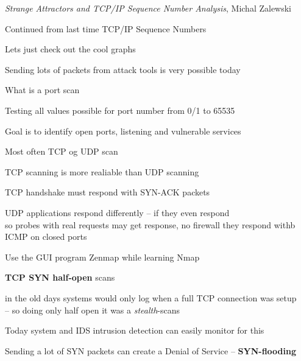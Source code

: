\documentclass[Screen16to9,17pt]{foils}
\begin{document}

\emph{Strange Attractors and TCP/IP Sequence Number Analysis}, Michal Zalewski\\ 

\begin{list1}
\item Continued from last time TCP/IP Sequence Numbers
\begin{list2}
\item Lets just check out the cool graphs
\item Sending lots of packets from attack tools is very possible today
\end{list2}
\end{list1}



\begin{list1}
\item What is a port scan
\item Testing all values possible for port number from 0/1 to 65535
\item Goal is to identify open ports, listening and vulnerable services
\item Most often TCP og UDP scan
\item TCP scanning is more realiable than UDP scanning
\item TCP handshake must respond with SYN-ACK packets
\item UDP applications respond differently -- if they even respond\\
so probes with real requests may get response, no firewall they respond withb ICMP on closed ports
\item Use the GUI program Zenmap while learning Nmap
\end{list1}



\begin{list2}
\item {\bfseries TCP SYN half-open} scans
\item in the old days systems would only log when a full TCP connection was setup\\
  -- so doing only half open it was a \emph{stealth}-scans
\item Today system and IDS intrusion detection can easily monitor for this
\item Sending a lot of SYN packets can create a Denial of Service -- {\bfseries SYN-flooding}
\end{list2}
\end{document}
